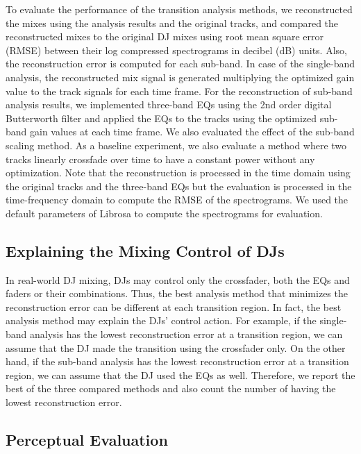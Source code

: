 \documentclass[sigconf]{nimeart}
\begin{document}
To evaluate the performance of the transition analysis methods, we reconstructed the mixes using the analysis results and the original tracks, and compared the reconstructed mixes to the original DJ mixes using root mean square error (RMSE) between their log compressed spectrograms in decibel (dB) units. Also, the reconstruction error is computed for each sub-band. In case of the single-band analysis, the reconstructed mix signal is generated multiplying the optimized gain value to the track signals for each time frame. For the reconstruction of sub-band analysis results, we implemented three-band EQs using the 2nd order digital Butterworth filter and applied the EQs to the tracks using the optimized sub-band gain values at each time frame. We also evaluated the effect of the sub-band scaling method. As a baseline experiment, we also evaluate a method where two tracks linearly crossfade over time to have a constant power without any optimization. Note that the reconstruction is processed in the time domain using the original tracks and the three-band EQs but the evaluation is processed in the time-frequency domain to compute the RMSE of the spectrograms. We used the default parameters of Librosa to compute the spectrograms for evaluation.

\subsection{Explaining the Mixing Control of DJs}\label{explaining-the-mixing-control-of-djs}

In real-world DJ mixing, DJs may control only the crossfader, both the EQs and faders or their combinations. Thus, the best analysis method that minimizes the reconstruction error can be different at each transition region. In fact, the best analysis method may explain the DJs' control action. For example, if the single-band analysis has the lowest reconstruction error at a transition region, we can assume that the DJ made the transition using the crossfader only. On the other hand, if the sub-band analysis has the lowest reconstruction error at a transition region, we can assume that the DJ used the EQs as well. Therefore, we report the best of the three compared methods and also count the number of having the lowest reconstruction error.

\subsection{Perceptual Evaluation}\label{perceptual-evaluation}
\end{document}
